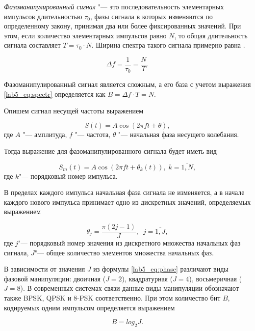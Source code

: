 \emph{Фазоманипулированный сигнал} "--- это последовательность элементарных импульсов длительностью $\tau_0$, фазы сигнала в которых изменяются по определенному закону, принимая два или более фиксированных значений. При этом, если количество элементарных импульсов равно $N$, то общая длительность сигнала составляет $T=\tau_0\cdot N$. Ширина спектра такого сигнала примерно равна \cite{Varakin}.

\begin{equation}
\Delta f= \frac{1}{\tau_0} = \frac{N}{T}.
\label{lab5_eq:spectr}
\end{equation}
	
Фазоманипулированный сигнал является сложным, а его база с учетом выражения \eqref{lab5_eq:spectr} определяется как $B = \Delta f \cdot T = N$.
	
Опишем сигнал несущей частоты выражением

\begin{equation*}
S(t) = A\cos(2\pi f t +\theta), 
\label{lab5_eq:carryf}
\end{equation*}
где $A$ "--- амплитуда, $f$ "--- частота, $\theta$ "--- начальная фаза несущего колебания.
   
Тогда выражение для фазоманипулированного сигнала будет иметь вид

\begin{equation}
S_m(t) = A\cos(2\pi f t +\theta_k(t)),\; k=\overline{1, N}, 
\label{lab5_eq:fkm}  
\end{equation}	
где $k$"--- порядковый номер импульса.

В пределах каждого импульса начальная фаза сигнала не изменяется, а в начале каждого нового импульса принимает одно из дискретных значений, определяемых выражением 

\begin{equation}
\theta_j= \frac{\pi(2j-1)}{J},\;\; j=\overline{1, J}, 
\label{lab5_eq:phase}
\end{equation}
где $j$"--- порядковый номер значения из дискретного множества начальных фаз сигнала, $J$"--- общее количество элементов множества начальных фаз.	

В зависимости от значения $J$ из формулы \eqref{lab5_eq:phase} различают виды фазовой манипуляции: двоичная ($J = 2$), квадратурная ($J = 4$), восьмеричная ($J = 8$). В современных системах связи данные виды манипуляции обозначают также BPSK, QPSK и 8-PSK соответственно. При этом количество бит $B$, кодируемых одним импульсом определяется выражением

\begin{equation}
B = log_2 J. \label{lab5_eq:numbits}
\end{equation}
	
